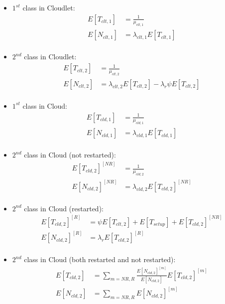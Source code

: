 \begin{itemize}
	\item $1^{st}$ class in Cloudlet:
	\begin{equation} 
	\begin{split}
	E[T_{clt,1}] &= \frac{1}{\mu_{clt,1}} \\
	E[N_{clt,1}] &= \lambda_{clt,1}E[T_{clt,1}] \\
	\end{split}
	\end{equation}

	\item $2^{nd}$ class in Cloudlet:
	\begin{equation} 
	\begin{split}
	E[T_{clt,2}] &= \frac{1}{\mu_{clt,2}} \\
	E[N_{clt,2}] &= \lambda_{clt,2}E[T_{clt,2}]-\lambda_{r}\psi E[T_{clt,2}] \\
	\end{split}
	\end{equation}
	
	\item $1^{st}$ class in Cloud:
	\begin{equation} 
	\begin{split}
	E[T_{cld,1}] &= \frac{1}{\mu_{cld,1}} \\
	E[N_{cld,1}] &= \lambda_{cld,1}E[T_{cld,1}] \\
	\end{split}
	\end{equation}
	
	\item $2^{nd}$ class in Cloud (not restarted):
	\begin{equation} 
	\begin{split}
	E[T_{cld,2}]^{[NR]} &= \frac{1}{\mu_{cld,2}} \\
	E[N_{cld,2}]^{[NR]} &= \lambda_{cld,2}E[T_{cld,2}]^{[NR]} \\
	\end{split}
	\end{equation}
	
	\item $2^{nd}$ class in Cloud (restarted):
	\begin{equation} 
	\begin{split}
	E[T_{cld,2}]^{[R]} &= \psi E[T_{clt,2}]+E[T_{setup}]+ E[T_{cld,2}]^{[NR]} \\
	E[N_{cld,2}]^{[R]} &= \lambda_{r}E[T_{cld,2}]^{[R]} \\
	\end{split}
	\end{equation}
	
	\item $2^{nd}$ class in Cloud (both restarted and not restarted):
	\begin{equation} 
	\begin{split}
	E[T_{cld,2}] &= \sum_{m=NR,R}\frac{E[N_{cld,2}]^{[m]}}{E[N_{cld,2}]}E[T_{cld,2}]^{[m]} \\
	E[N_{cld,2}] &= \sum_{m=NR,R}E[N_{cld,2}]^{[m]} \\
	\end{split}
	\end{equation}
\end{itemize}

